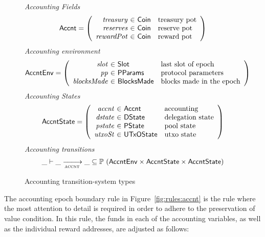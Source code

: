 \begin{figure}[htb]
  \emph{Accounting Fields}
  \begin{equation*}
    \Accnt =
    \left(
      \begin{array}{r@{~\in~}ll}
        \var{treasury} & \Coin & \text{treasury pot}\\
        \var{reserves} & \Coin & \text{reserve pot}\\
        \var{rewardPot} & \Coin & \text{reward pot}\\
      \end{array}
    \right)
  \end{equation*}
  \emph{Accounting environment}
  \begin{equation*}
    \AccntEnv =
    \left(
      \begin{array}{r@{~\in~}ll}
        \var{slot} & \Slot & \text{last slot of epoch}\\
        \var{pp} & \PParams & \text{protocol parameters}\\
        \var{blocksMade} & \BlocksMade & \text{blocks made in the epoch}\\
      \end{array}
    \right)
  \end{equation*}
  \emph{Accounting States}
  \begin{equation*}
    \AccntState =
    \left(
      \begin{array}{r@{~\in~}ll}
        \var{accnt} & \Accnt & \text{accounting}\\
        \var{dstate} & \DState & \text{delegation state}\\
        \var{pstate} & \PState & \text{pool state}\\
        \var{utxoSt} & \UTxOState & \text{utxo state}\\
      \end{array}
    \right)
  \end{equation*}
  \emph{Accounting transitions}
  \begin{equation*}
    \_ \vdash
    \var{\_} \trans{accnt}{} \var{\_}
    \subseteq \powerset (\AccntEnv \times \AccntState \times \AccntState)
  \end{equation*}
  \caption{Accounting transition-system types}
  \label{fig:ts-types:accnt}
\end{figure}


The accounting epoch boundary rule in Figure~\ref{fig:rules:accnt} is the rule
where the most attention to detail is required in order to adhere to the
preservation of value condition. In this rule, the funds in each of the
accounting variables, as well as the individual reward addresses, are adjusted
as follows:

